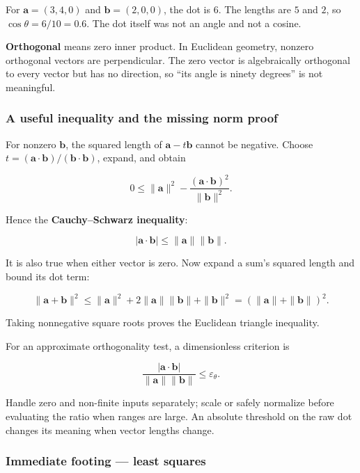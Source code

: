 For \(\mathbf a=(3,4,0)\) and \(\mathbf b=(2,0,0)\), the dot is \(6\). The lengths are \(5\) and \(2\), so \(\cos\theta=6/10=0.6\). The dot itself was not an angle and not a cosine.

\textbf{Orthogonal} means zero inner product. In Euclidean geometry, nonzero orthogonal vectors are perpendicular. The zero vector is algebraically orthogonal to every vector but has no direction, so ``its angle is ninety degrees'' is not meaningful.

\subsubsection{A useful inequality and the missing norm proof}\label{01-foundations-i-ch017-a-useful-inequality-and-the-missing-norm-proof}

\hypertarget{01-foundations-i-ch017-a-useful-inequality-and-the-missing-norm-proof}{}

For nonzero \(\mathbf b\), the squared length of \(\mathbf a-t\mathbf b\) cannot be negative. Choose \(t=(\mathbf a\cdot\mathbf b)/(\mathbf b\cdot\mathbf b)\), expand, and obtain

\[
0\le\|\mathbf a\|^2-
\frac{(\mathbf a\cdot\mathbf b)^2}{\|\mathbf b\|^2}.
\]

Hence the \textbf{Cauchy--Schwarz inequality}:

\[
|\mathbf a\cdot\mathbf b|\le\|\mathbf a\|\|\mathbf b\|.
\]

It is also true when either vector is zero. Now expand a sum's squared length and bound its dot term:

\[
\|\mathbf a+\mathbf b\|^2
\le\|\mathbf a\|^2+2\|\mathbf a\|\|\mathbf b\|+\|\mathbf b\|^2
=(\|\mathbf a\|+\|\mathbf b\|)^2.
\]

Taking nonnegative square roots proves the Euclidean triangle inequality.

For an approximate orthogonality test, a dimensionless criterion is

\[
\frac{|\mathbf a\cdot\mathbf b|}{\|\mathbf a\|\|\mathbf b\|}
\le\varepsilon_\theta.
\]

Handle zero and non-finite inputs separately; scale or safely normalize before evaluating the ratio when ranges are large. An absolute threshold on the raw dot changes its meaning when vector lengths change.

\subsubsection{Immediate footing --- least squares}\label{01-foundations-i-ch017-immediate-footing-least-squares}

